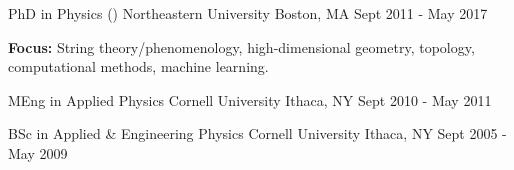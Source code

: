 

\begin{cventries}

  \cventry
    {PhD in Physics (\href{http://hdl.handle.net/2047/D20248609}{\color{blue}{Dissertation}})} %
    {Northeastern University} %
    {Boston, MA} %
    {Sept 2011 - May 2017} %
    {
      \begin{cvitems} %
        \item {\textbf{Focus:} String theory/phenomenology, high-dimensional geometry, topology, computational methods, machine learning.}
      \end{cvitems}
    }

  \cventry
    {MEng in Applied Physics} %
    {Cornell University} %
    {Ithaca, NY} %
    {Sept 2010 - May 2011} %
    {
    }

  \cventry
    {BSc in Applied \& Engineering Physics} %
    {Cornell University} %
    {Ithaca, NY} %
    {Sept 2005 - May 2009} %
    {
    }
\end{cventries}
